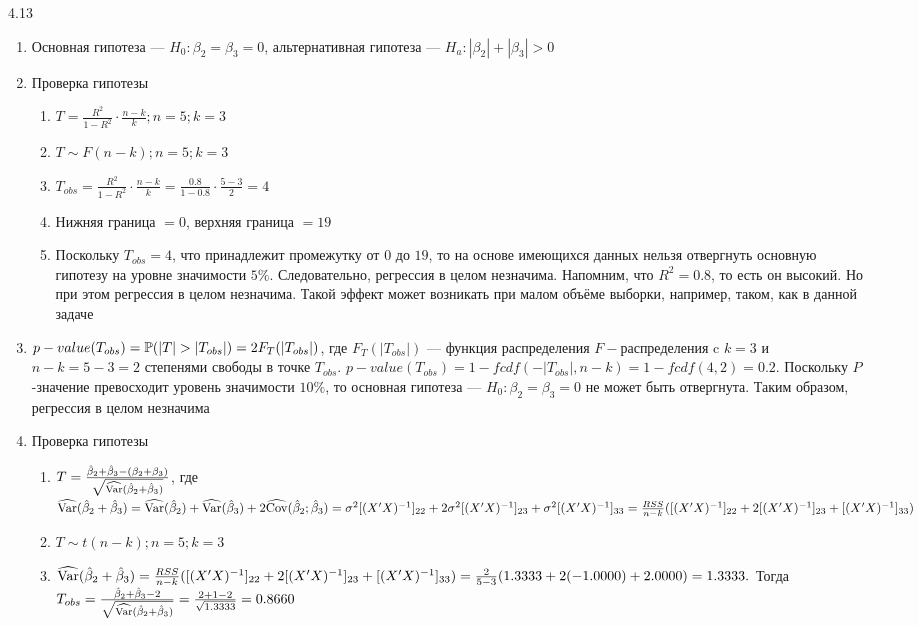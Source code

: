 \begin{solution}{{4.13}}
\begin{enumerate}
\begin{enumerate}
\end{enumerate}
\item Основная гипотеза — $H_0: \beta_2 = \beta_3 = 0$, альтернативная гипотеза — $H_a: |\beta_2| + |\beta_3| > 0$
\item Проверка гипотезы
\begin{enumerate}
\item $T = \frac{R^2}{1 - R^2} \cdot \frac{n-k}{k}; n = 5; k = 3$
\item $T \sim F(n-k); n = 5; k = 3$
\item $T_{obs} = \frac{R^2}{1 - R^2} \cdot \frac{n-k}{k} = \frac{0.8}{1 - 0.8} \cdot \frac{5-3}{2} = 4$
\item Нижняя граница $= 0$, верхняя граница $= 19$
\item Поскольку $T_{obs} = 4$, что принадлежит промежутку от $0$ до $19$, то на основе имеющихся данных нельзя отвергнуть основную гипотезу на уровне значимости $5\%$. Следовательно, регрессия в целом незначима. Напомним, что $R^2 = 0.8$, то есть он высокий. Но при этом регрессия в целом незначима. Такой эффект может возникать при малом объёме выборки, например, таком, как в данной задаче
\end{enumerate}
\item $p-value(T_{obs}) = \P (|T|>|T_{obs}|) = 2F_{T}(|T_{obs}|)$, где $F_{T}(|T_{obs}|)$ — функция распределения $F-$распределения c $k = 3$ и $n - k = 5 - 3 = 2$ степенями свободы в точке $T_{obs}$. $p-value(T_{obs}) = 1 - fcdf(-|T_{obs}|, n - k) = 1 - fcdf(4,2) = 0.2$. Поскольку $P$-значение превосходит уровень значимости $10\%$, то основная гипотеза — $H_0: \beta_2 = \beta_3 = 0$ не может быть отвергнута. Таким образом, регрессия в целом незначима
\item Проверка гипотезы
\begin{enumerate}
\item $T = \frac{\hat{\beta}_2 + \hat{\beta}_3 - (\beta_2 + \beta_3)}{\sqrt{\widehat{\operatorname{Var}}(\hat{\beta}_2 + \hat{\beta}_3)}}$, где $\widehat{\operatorname{Var}}(\hat{\beta}_2 + \hat{\beta}_3) = \widehat{\operatorname{Var}}(\hat{\beta}_2) + \widehat{\operatorname{Var}}(\hat{\beta}_3) + 2\widehat{\operatorname{Cov}}(\hat{\beta}_2;\hat{\beta}_3) = \sigma^2 [(X'X)^{-1}]_{22} + 2\sigma^2 [(X'X)^{-1}]_{23} + \sigma^2 [(X'X)^{-1}]_{33}= \frac{RSS}{n - k}([(X'X)^{-1}]_{22} + 2[(X'X)^{-1}]_{23} + [(X'X)^{-1}]_{33})$
\item $T \sim t(n-k); n = 5; k = 3$
\item $\widehat{\operatorname{Var}}(\hat{\beta}_2 + \hat{\beta}_3) = \frac{RSS}{n - k}([(X'X)^{-1}]_{22} + 2[(X'X)^{-1}]_{23} + [(X'X)^{-1}]_{33}) = \frac{2}{5 - 3} (1.3333 + 2(-1.0000) + 2.0000) = 1.3333.$ Тогда $T_{obs} = \frac{\hat{\beta}_2 + \hat{\beta}_3 - 2}{\sqrt{\widehat{\operatorname{Var}}(\hat{\beta}_2 + \hat{\beta}_3)}} = \frac{2 + 1 - 2}{\sqrt{1.3333}} = 0.8660$

\end{enumerate}
\end{enumerate}
\end{solution}
